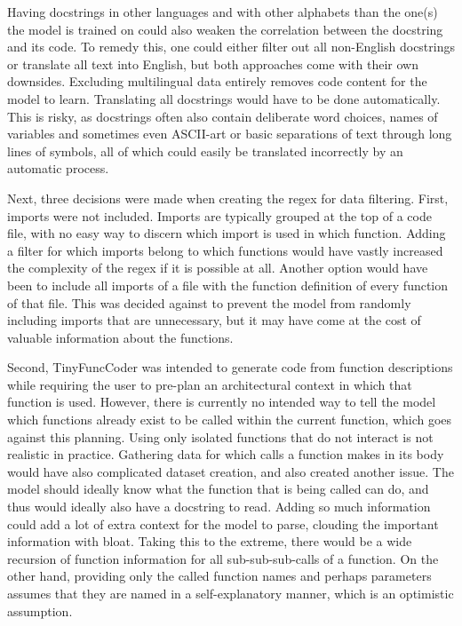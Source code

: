 Having docstrings in other languages and with other alphabets than the one(s) the model is trained on could also weaken the correlation between the docstring and its code.
To remedy this, one could either filter out all non-English docstrings or translate all text into English, but both approaches come with their own downsides.
Excluding multilingual data entirely removes code content for the model to learn.
Translating all docstrings would have to be done automatically.
This is risky, as docstrings often also contain deliberate word choices, names of variables and sometimes even ASCII-art or basic separations of text through long lines of symbols, all of which could easily be translated incorrectly by an automatic process.

Next, three decisions were made when creating the \ac{regex} for data filtering.
First, imports were not included.
Imports are typically grouped at the top of a code file, with no easy way to discern which import is used in which function.
Adding a filter for which imports belong to which functions would have vastly increased the complexity of the \ac{regex} if it is possible at all.
Another option would have been to include all imports of a file with the function definition of every function of that file.
This was decided against to prevent the model from randomly including imports that are unnecessary, but it may have come at the cost of valuable information about the functions.

Second, TinyFuncCoder was intended to generate code from function descriptions while requiring the user to pre-plan an architectural context in which that function is used.
However, there is currently no intended way to tell the model which functions already exist to be called within the current function, which goes against this planning.
Using only isolated functions that do not interact is not realistic in practice.
Gathering data for which calls a function makes in its body would have also complicated dataset creation, and also created another issue.
The model should ideally know what the function that is being called can do, and thus would ideally also have a docstring to read.
Adding so much information could add a lot of extra context for the model to parse, clouding the important information with bloat.
Taking this to the extreme, there would be a wide recursion of function information for all sub-sub-sub-calls of a function.
On the other hand, providing only the called function names and perhaps parameters assumes that they are named in a self-explanatory manner, which is an optimistic assumption.

